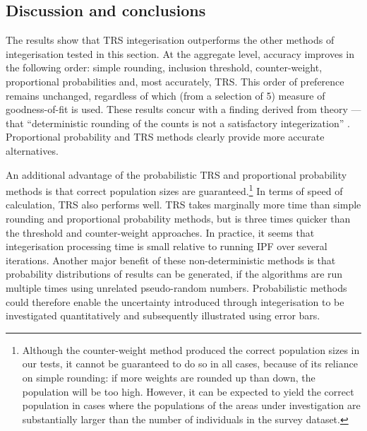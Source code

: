 \subsection{Discussion and conclusions}
\label{discuss}
The results show that TRS integerisation outperforms the other methods of
integerisation tested in this section.
At the aggregate level, accuracy
improves in the following order: simple rounding,
inclusion threshold, counter-weight, proportional probabilities and, most
accurately, TRS. This order of preference remains unchanged, regardless of which
(from a selection of 5) measure of goodness-of-fit is used. These results
concur with a finding derived from theory --- that ``deterministic rounding of
the counts is not a satisfactory integerization''
\citep[p.~689]{Pritchard2012}.
Proportional probability and TRS methods clearly provide more accurate
alternatives.

An additional advantage of the probabilistic TRS and proportional probability
methods is that correct population sizes are guaranteed.\footnote{Although
the counter-weight method produced the correct population sizes in our tests, it
cannot be guaranteed to do so in all cases, because of its reliance on simple
rounding: if more weights are rounded up than down, the population will be too
high. However, it can be expected to yield the correct population in cases
where the populations of the areas under investigation are substantially
larger than the number of individuals in the survey dataset.}
In terms of speed of calculation, TRS also performs well. TRS takes marginally
more time than simple rounding and proportional probability methods,
but is three times quicker than the threshold and counter-weight
approaches. In practice, it seems that integerisation processing time is
small relative to running IPF over several iterations. Another
major benefit of these non-deterministic methods is that probability
distributions of results can be generated, if the algorithms are run multiple
times using unrelated pseudo-random numbers. Probabilistic methods could
therefore enable the uncertainty introduced through integerisation to be
investigated quantitatively
\citep{Beckman1996, Rubin1987} and subsequently illustrated using error bars.

